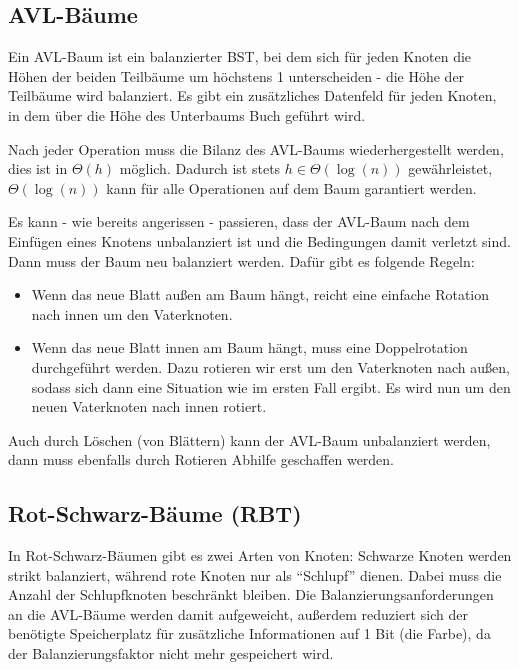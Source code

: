 \documentclass[12pt]{article}
\begin{document}
\subsection{AVL-Bäume}

Ein AVL-Baum ist ein balanzierter BST, bei dem sich für jeden Knoten die Höhen der beiden Teilbäume um höchstens 1 unterscheiden - die Höhe der Teilbäume wird balanziert. Es gibt ein zusätzliches Datenfeld für jeden Knoten, in dem über die Höhe des Unterbaums Buch geführt wird.

Nach jeder Operation muss die Bilanz des AVL-Baums wiederhergestellt werden, dies ist in $\Theta(h)$ möglich. Dadurch ist stets $h \in \Theta(\log(n))$ gewährleistet, $\Theta(\log(n))$ kann für alle Operationen auf dem Baum garantiert werden.

Es kann - wie bereits angerissen - passieren, dass der AVL-Baum nach dem Einfügen eines Knotens unbalanziert ist und die Bedingungen damit verletzt sind. Dann muss der  Baum neu balanziert werden. Dafür gibt es folgende Regeln:

\begin{itemize}  
\item Wenn das neue Blatt außen am Baum hängt, reicht eine einfache Rotation nach innen um den Vaterknoten.
\item Wenn das neue Blatt innen am Baum hängt, muss eine Doppelrotation durchgeführt werden. Dazu rotieren wir erst um den Vaterknoten nach außen, sodass sich dann eine Situation wie im ersten Fall ergibt. Es wird nun um den neuen Vaterknoten nach innen rotiert.
\end{itemize}

Auch durch Löschen (von Blättern) kann der AVL-Baum unbalanziert werden, dann muss ebenfalls durch Rotieren Abhilfe geschaffen werden.

\subsection{Rot-Schwarz-Bäume (RBT)}

In Rot-Schwarz-Bäumen gibt es zwei Arten von Knoten: Schwarze Knoten werden strikt balanziert, während rote Knoten nur als \enquote{Schlupf} dienen. Dabei muss die Anzahl der Schlupfknoten beschränkt bleiben. Die Balanzierungsanforderungen an die AVL-Bäume werden damit aufgeweicht, außerdem reduziert sich der benötigte Speicherplatz für zusätzliche Informationen auf 1 Bit (die Farbe), da der Balanzierungsfaktor nicht mehr gespeichert wird.
\end{document}
